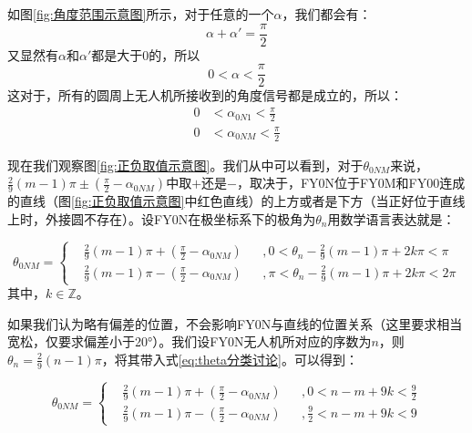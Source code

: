 \documentclass[12pt,AutoFakeSlant,AutoFakeBold]{article}
\begin{document}
如图\ref{fig:角度范围示意图}所示，对于任意的一个$\alpha$，我们都会有：
\begin{equation}
    \alpha+\alpha ' = \frac{\pi}{2}
\end{equation}
又显然有$\alpha$和$\alpha '$都是大于0的，所以
\begin{equation}
    0 < \alpha < \frac{\pi}{2}
\end{equation}
这对于，所有的圆周上无人机所接收到的角度信号都是成立的，所以：
\begin{align}
    0 &< \alpha_{0N1} < \frac{\pi}{2}\\
    0 &< \alpha_{0NM} < \frac{\pi}{2}
\end{align}

现在我们观察图\ref{fig:正负取值示意图}。我们从中可以看到，对于$\theta_{0NM}$来说，$\frac{2}{9}\left(m-1\right)\pi \pm \left(\frac{\pi}{2} - \alpha_{0NM}\right)$中取$+$还是$-$，取决于，FY0N位于FY0M和FY00连成的直线（图\ref{fig:正负取值示意图}中红色直线）的上方或者是下方（当正好位于直线上时，外接圆不存在）。设FY0N在极坐标系下的极角为$\theta_n$用数学语言表达就是：

\begin{equation}
    \theta_{0NM} = \left\{
    \begin{aligned}
        & \frac{2}{9}\left(m-1\right)\pi + \left(\frac{\pi}{2} - \alpha_{0NM}\right)&&,
        0 < \theta_n - \frac{2}{9}\left(m-1\right)\pi + 2k\pi< \pi\\
        & \frac{2}{9}(m-1)\pi - \left(\frac{\pi}{2} - \alpha_{0NM}\right)&&,
        \pi < \theta_n - \frac{2}{9}(m-1)\pi + 2k\pi < 2\pi
    \end{aligned}
    \right.
    \label{eq:theta分类讨论}
\end{equation}
其中，$k \in \mathbb{Z}$。

如果我们认为略有偏差的位置，不会影响FY0N与直线的位置关系（这里要求相当宽松，仅要求偏差小于20°）。我们设FY0N无人机所对应的序数为$n$，则$\theta_n=\frac{2}{9}(n-1)\pi$，将其带入式\ref{eq:theta分类讨论}。可以得到：

\begin{equation}
    \theta_{0NM} = \left\{
    \begin{aligned}
        & \frac{2}{9}\left(m-1\right)\pi + \left(\frac{\pi}{2} - \alpha_{0NM}\right)&&,
        0 < n - m + 9k < \frac{9}{2}\\
        & \frac{2}{9}\left(m-1\right)\pi - \left(\frac{\pi}{2} - \alpha_{0NM}\right)&&,
        \frac{9}{2} < n - m + 9k < 9
    \end{aligned}
    \right.
    \label{eq:theta分类讨论最终结果}
\end{equation}
\end{document}
